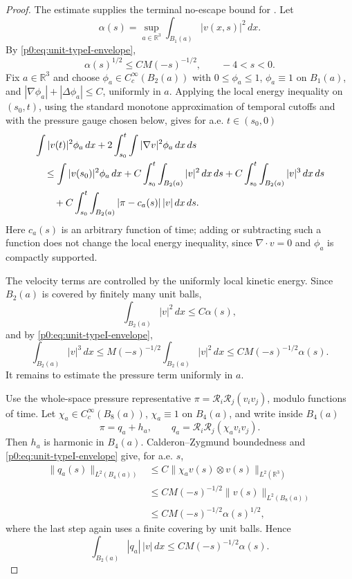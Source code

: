 \documentclass[11pt]{amsart}
\theoremstyle{plain}
\theoremstyle{definition}
\theoremstyle{remark}
\numberwithin{equation}{section}
\begin{document}
\begin{proof}
The estimate supplies the terminal no-escape bound for
.  Let
\[
  \alpha(s)=\sup_{a\in\mathbb R^3}\int_{B_1(a)} |v(x,s)|^2\,dx .
\]
By \eqref{p0:eq:unit-typeI-envelope},
\begin{equation}\label{p0:eq:alpha-typeI-trivial}
  \alpha(s)^{1/2}\le C M(-s)^{-1/2},
  \qquad -4<s<0 .
\end{equation}
Fix \(a\in\mathbb R^3\) and choose
\(\phi_a\in C_c^\infty(B_2(a))\) with
\(0\le\phi_a\le1\), \(\phi_a\equiv1\) on \(B_1(a)\), and
\(|\nabla\phi_a|+|\Delta\phi_a|\le C\), uniformly in \(a\).  Applying the
local energy inequality on \((s_0,t)\), using the standard monotone
approximation of temporal cutoffs and with the pressure gauge chosen below,
gives for a.e. \(t\in(s_0,0)\)
\begin{align}
 &\int |v(t)|^2\phi_a\,dx
   +2\int_{s_0}^{t}\int |\nabla v|^2\phi_a\,dx\,ds       \notag \\
 &\quad\le
   \int |v(s_0)|^2\phi_a\,dx
   +C\int_{s_0}^{t}\int_{B_2(a)} |v|^2\,dx\,ds
   +C\int_{s_0}^{t}\int_{B_2(a)} |v|^3\,dx\,ds          \notag \\
 &\qquad
   +C\int_{s_0}^{t}\int_{B_2(a)}
       |\pi-c_a(s)|\,|v|\,dx\,ds .
\label{p0:eq:lei-unit-estimate}
\end{align}
Here \(c_a(s)\) is an arbitrary function of time; adding or subtracting such a
function does not change the local energy inequality, since
\(\nabla\cdot v=0\) and \(\phi_a\) is compactly supported.

The velocity terms are controlled by the uniformly local kinetic energy.  Since \(B_2(a)\) is covered by
finitely many unit balls,
\[
  \int_{B_2(a)} |v|^2\,dx\le C\alpha(s),
\]
and by \eqref{p0:eq:unit-typeI-envelope},
\begin{equation}\label{p0:eq:cubic-unit-bound}
  \int_{B_2(a)} |v|^3\,dx
  \le M(-s)^{-1/2}\int_{B_2(a)} |v|^2\,dx
  \le C M(-s)^{-1/2}\alpha(s).
\end{equation}
It remains to estimate the pressure term uniformly in \(a\).

Use the whole-space pressure representative
\(\pi=\mathcal R_i\mathcal R_j(v_i v_j)\), modulo functions of time.  Let
\(\chi_a\in C_c^\infty(B_8(a))\), \(\chi_a\equiv1\) on \(B_4(a)\), and write
inside \(B_4(a)\)
\[
  \pi=q_a+h_a,
  \qquad
  q_a=\mathcal R_i\mathcal R_j(\chi_a v_i v_j).
\]
Then \(h_a\) is harmonic in \(B_4(a)\).  Calderon--Zygmund boundedness
\cite{Stein1970} and \eqref{p0:eq:unit-typeI-envelope} give, for a.e. \(s\),
\begin{align*}
  \|q_a(s)\|_{L^2(B_4(a))}
  &\le C\|\chi_a v(s)\otimes v(s)\|_{L^2(\mathbb R^3)}  \\
  &\le C M(-s)^{-1/2}\|v(s)\|_{L^2(B_8(a))}             \\
  &\le C M(-s)^{-1/2}\alpha(s)^{1/2},
\end{align*}
where the last step again uses a finite covering by unit balls.  Hence
\begin{equation}\label{p0:eq:local-pressure-unit}
  \int_{B_2(a)} |q_a|\,|v|\,dx
  \le C M(-s)^{-1/2}\alpha(s).
\end{equation}


\end{proof}
\end{document}
